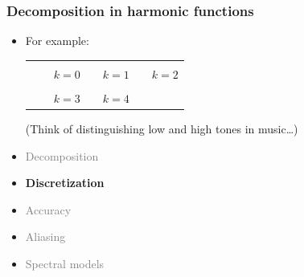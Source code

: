 \documentclass[aspectratio=43,9pt]{beamer}
\begin{document}
\begin{frame}
	\frametitle{Decomposition in harmonic functions}
	\vfill\begin{itemize}
		\item For example:\vspace*{2ex}
			\hspace*{-10pt}\begin{tabular}{@{}r@{}c@{}c@{}c@{}c@{}c@{}c@{}}
				\scalebox{.35}{\small}\raisebox{8mm}{$=$}	& %
												&	\scalebox{.35}{\small}	&
						\raisebox{8mm}{$+$}	&	\scalebox{.35}{\small}	&
						\raisebox{8mm}{$+$}	&	\scalebox{.35}{\small}	\\
					&&	$k=0$	&&	$k=1$	&& $k=2$\\[4mm]
					&	\raisebox{8mm}{$+$}	&	\scalebox{.35}{\small}	&
						\raisebox{8mm}{$+$}	&	\scalebox{.35}{\small}	&
						\raisebox{8mm}{$+$}	&	\raisebox{8mm}{$\ldots$}\\
					&&	$k=3$	&&	$k=4$\\[3mm]
			\end{tabular}\vfill
			\par
			(Think of distinguishing low and high tones in music\ldots)
	\end{itemize}\vfill
\end{frame}
%
%
\begin{frame}
	\begin{itemize}
		\item {\textcolor{gray}{Decomposition}}
		\item {\bfseries Discretization}
		\item {\textcolor{gray}{Accuracy}}
		\item {\textcolor{gray}{Aliasing}}
		\item {\textcolor{gray}{Spectral models}}
	\end{itemize}
\end{frame}
%
%
\end{document}
